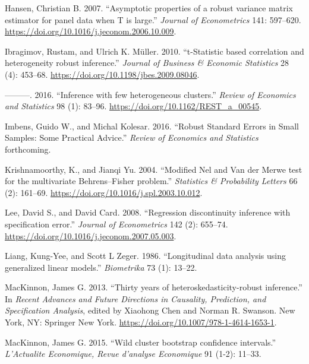 \documentclass[12pt]{article}
\newlength{\cslhangindent}
\newlength{\cslentryspacingunit} %
\newenvironment{CSLReferences}[2] %
 {%
  \setlength{\parindent}{0pt}
  \ifodd #1
  \let\oldpar\par
  \def\par{\hangindent=\cslhangindent\oldpar}
  \fi
  \setlength{\parskip}{#2\cslentryspacingunit}
 }%
 {}
\begin{document}
\begin{CSLReferences}{1}{0}
\leavevmode{}%
Hansen, Christian B. 2007. {``{Asymptotic properties of a robust
variance matrix estimator for panel data when T is large}.''}
\emph{Journal of Econometrics} 141: 597--620.
\url{https://doi.org/10.1016/j.jeconom.2006.10.009}.

\leavevmode{}%
Ibragimov, Rustam, and Ulrich K. Müller. 2010. {``{t-Statistic based
correlation and heterogeneity robust inference}.''} \emph{Journal of
Business \& Economic Statistics} 28 (4): 453--68.
\url{https://doi.org/10.1198/jbes.2009.08046}.

\leavevmode{}%
---------. 2016. {``{Inference with few heterogeneous clusters}.''}
\emph{Review of Economics and Statistics} 98 (1): 83--96.
\url{https://doi.org/10.1162/REST_a_00545}.

\leavevmode{}%
Imbens, Guido W., and Michal Kolesar. 2016. {``{Robust Standard Errors
in Small Samples: Some Practical Advice}.''} \emph{Review of Economics
and Statistics} forthcoming.

\leavevmode{}%
Krishnamoorthy, K., and Jianqi Yu. 2004. {``{Modified Nel and Van der
Merwe test for the multivariate Behrens--Fisher problem}.''}
\emph{Statistics {\&} Probability Letters} 66 (2): 161--69.
\url{https://doi.org/10.1016/j.spl.2003.10.012}.

\leavevmode{}%
Lee, David S., and David Card. 2008. {``{Regression discontinuity
inference with specification error}.''} \emph{Journal of Econometrics}
142 (2): 655--74. \url{https://doi.org/10.1016/j.jeconom.2007.05.003}.

\leavevmode{}%
Liang, Kung-Yee, and Scott L Zeger. 1986. {``{Longitudinal data analysis
using generalized linear models}.''} \emph{Biometrika} 73 (1): 13--22.

\leavevmode{}%
MacKinnon, James G. 2013. {``{Thirty years of heteroskedasticity-robust
inference}.''} In \emph{Recent Advances and Future Directions in
Causality, Prediction, and Specification Analysis}, edited by Xiaohong
Chen and Norman R. Swanson. New York, NY: Springer New York.
\url{https://doi.org/10.1007/978-1-4614-1653-1}.

\leavevmode{}%
MacKinnon, James G. 2015. {``{Wild cluster bootstrap confidence
intervals}.''} \emph{L'Actualite Economique, Revue d'analyse Economique}
91 (1-2): 11--33.


\end{CSLReferences}
\end{document}
